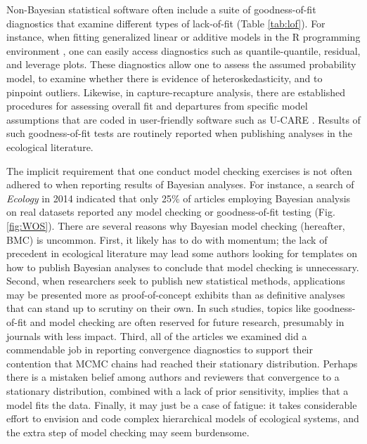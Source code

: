 \documentclass[12pt,english]{article}
\begin{document}
\begin{spacing}{1.9}
Non-Bayesian statistical software often include a suite of
goodness-of-fit diagnostics that examine different types of
lack-of-fit (Table \ref{tab:lof}).  For instance, when fitting
generalized linear \citep{McCullaghNelder1989} or additive
\citep{Wood2006} models in the R programming environment
\citep{RTeam2017}, one can easily access diagnostics such as
quantile-quantile, residual, and leverage plots.  These diagnostics
allow one to assess the assumed probability
model, to examine whether there is evidence of heteroskedasticity, and
to pinpoint outliers.  Likewise, in capture-recapture analysis, there
are established procedures for assessing overall fit and
departures from specific model assumptions that are coded in
user-friendly software such as U-CARE \citep{ChoquetEtAl2009}.
Results of such goodness-of-fit tests are routinely reported when
publishing analyses in the ecological literature.

The implicit requirement that one conduct model checking exercises is
not often adhered to when reporting results of Bayesian analyses.  For instance, a search of
\textit{Ecology} in 2014 indicated that only 25\% of articles employing Bayesian
analysis on real datasets reported any model checking or
goodness-of-fit testing (Fig. \ref{fig:WOS}).  There are several
reasons why Bayesian model checking (hereafter, BMC) is uncommon.  First, it likely has
to do with momentum; the lack of precedent in ecological literature
may lead some authors looking for templates on how to publish Bayesian
analyses to conclude that model checking is unnecessary.  Second, when
researchers seek to publish new statistical methods, applications may
be presented more as proof-of-concept exhibits than as definitive
analyses that can stand up to scrutiny on their own. In such studies,
topics like goodness-of-fit and model checking are often reserved for
future research, presumably in journals with less impact.  Third, all
of the articles we examined did a commendable job in reporting
convergence diagnostics to support their contention that MCMC chains had reached their stationary distribution.  Perhaps
there is a mistaken belief among authors and reviewers that
convergence to a stationary distribution, combined with a lack of
prior sensitivity, implies that a model fits the data.  Finally, it
may just be a case of fatigue: it takes considerable effort to envision and code complex hierarchical models of ecological systems, and the extra step of model checking may seem burdensome.


\end{spacing}
\end{document}
